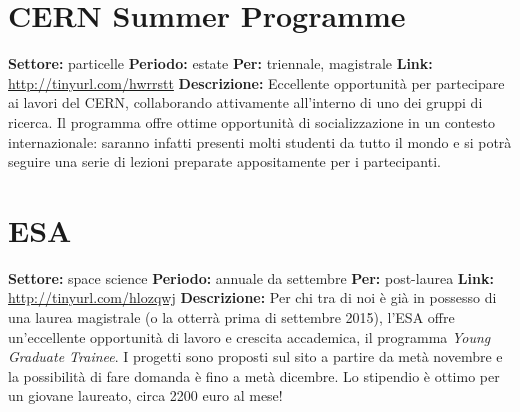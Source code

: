 \documentclass[a4paper,10pt]{article}
\begin{document}

\section{CERN Summer Programme}
\textbf{Settore:} particelle \newline %
\textbf{Periodo:} estate \newline
\textbf{Per:} triennale, magistrale \newline
\textbf{Link:}  \url{http://tinyurl.com/hwrrstt} \newline %
\textbf{Descrizione:} Eccellente opportunità per partecipare ai lavori del CERN, collaborando attivamente all’interno di uno dei gruppi di ricerca. Il programma offre ottime opportunità di socializzazione in un contesto internazionale: saranno infatti presenti molti studenti da tutto il mondo e si potrà seguire una serie di lezioni preparate appositamente per i partecipanti. 


\section{ESA} 
\textbf{Settore:} space science \newline
\textbf{Periodo:} annuale da settembre \newline
\textbf{Per:} post-laurea \newline
\textbf{Link:} \url{http://tinyurl.com/hlozqwj} \newline
\textbf{Descrizione:} Per chi tra di noi è già in possesso di una laurea magistrale (o la otterrà prima di settembre 2015), l'ESA offre un'eccellente opportunità di lavoro e crescita accademica, il programma \emph{Young Graduate Trainee}. I progetti sono proposti sul sito a partire da metà novembre e la possibilità di fare domanda è fino a metà dicembre. Lo stipendio è ottimo per un giovane laureato, circa 2200 euro al mese!
\end{document}
